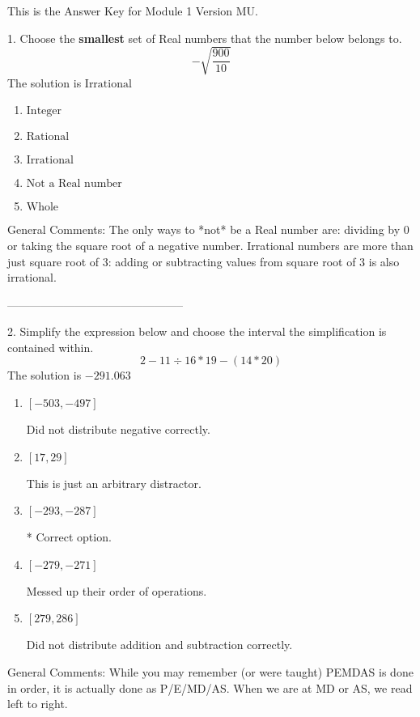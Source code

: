 \documentclass{article}[10pt]
\begin{document}
This is the Answer Key for Module 1 Version MU.

1. Choose the \textbf{smallest} set of Real numbers that the number below belongs to.
$$ -\sqrt{\frac{900}{10}} $$ 
The solution is $ \text{Irrational} $ 

\begin{enumerate}[label=\Alph*.] 
\item $ \text{Integer} $ 

  
\item $ \text{Rational} $ 

  
\item $ \text{Irrational} $ 

  
\item $ \text{Not a Real number} $ 

  
\item $ \text{Whole} $ 

  
\end{enumerate} 
 
General Comments: The only ways to *not* be a Real number are: dividing by 0 or taking the square root of a negative number. Irrational numbers are more than just square root of 3: adding or subtracting values from square root of 3 is also irrational.

-----------------------------------------------

2. Simplify the expression below and choose the interval the simplification is contained within.
$$ 2 - 11 \div 16 * 19 - (14 * 20) $$ 
The solution is $ -291.063 $ 

\begin{enumerate}[label=\Alph*.] 
\item $ [-503, -497] $ 

  Did not distribute negative correctly. 
\item $ [17, 29] $ 

  This is just an arbitrary distractor. 
\item $ [-293, -287] $ 

 * Correct option. 
\item $ [-279, -271] $ 

  Messed up their order of operations. 
\item $ [279, 286] $ 

  Did not distribute addition and subtraction correctly. 
\end{enumerate} 
 
General Comments: While you may remember (or were taught) PEMDAS is done in order, it is actually done as P/E/MD/AS. When we are at MD or AS, we read left to right.
\end{document}
